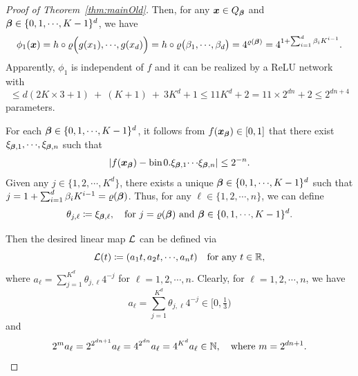 \documentclass[nohyperref]{article}
\theoremstyle{plain}
\theoremstyle{definition}
\theoremstyle{remark}
\begin{document}
\begin{proof}[Proof of Theorem~\ref{thm:mainOld}]
	Then, for any ${\bm{x}}\in Q_{\bm{\beta}}$ and $\bmbeta\in\{0,1,\cdots,K-1\}^d$, we have
	\begin{equation}
		\label{eq:psi1}
		\phi_1(\bmx)=h\circ\varrho\Big(g(x_1),\cdots,g(x_d)\Big)=h\circ\varrho\big(\beta_1,\cdots,\beta_d\big)=4^{\varrho(\bmbeta)}=4^{1+\sum_{i=1}^d \beta_i K^{i-1}}.
	\end{equation}
	Apparently, $\phi_1$ is independent of $f$ and it can be realized by a ReLU network with \[\le d(2K\times 3+1) \ +\  (K+1)\  +\   3K^d+1\le 11K^d +2=11\times 2^{dn}+2\le 2^{dn+4}\] parameters. 
	
	For each $\bmbeta\in \{0,1,\cdots,K-1\}^d$, it follows from $f({\bm{x}}_{\bm{\beta}})\in [0,1]$ that there exist 
	$\xi_{\bmbeta,1},\cdots,\xi_{\bmbeta,n}$ such that
	\begin{equation}
		\label{eq:fapproxbin}
		|f(\bmx_\bmbeta)-\bin 0.\xi_{\bmbeta,1}\cdots\xi_{\bmbeta,n}|\le 2^{-n}.
	\end{equation}
	Given any $j\in \{1,2,\cdots,K^d\}$, there exists a unique $\bmbeta\in \{0,1,\cdots,K-1\}^d$ such that $j=1+\sum_{i=1}^d \beta_i K^{i-1}=\varrho({\bm{\beta}})$. Thus, for any $\ell\in\{1,2,\cdots,n\}$, we can define
	\begin{equation}
		\label{eq:theta=xi}
		\theta_{j,\ell}\coloneqq\xi_{\bmbeta,\ell}, \quad \tn{for $j=\varrho(\bmbeta)$ and $\bmbeta\in \{0,1,\cdots,K-1\}^d$.}
	\end{equation}
	
	Then the desired linear map ${\mathcal{L}}$ can be defined via
	\begin{equation*}
		\calL(t)\coloneqq (a_1 t,a_2 t,\cdots, a_n t)\quad \tn{for any $t\in \R$,}
	\end{equation*}
	where $a_\ell=\sum_{j=1}^{K^d} \theta_{j,\ell}4^{-j}$ for $\ell=1,2,\cdots,n$. Clearly, for $\ell=1,2,\cdots,n$, we have
	\begin{equation*}
		a_\ell=\sum_{j=1}^{K^d} \theta_{j,\ell}4^{-j}\in [0,\tfrac{1}{3})
	\end{equation*}
	and 
	\begin{equation*}
		2^m a_\ell=2^{2^{dn+1}}a_\ell
		=4^{2^{dn}}a_\ell
		=4^{K^d}a_\ell\in \N, 
		\quad 
		\tn{where $m=2^{dn+1}$.}
	\end{equation*}
	

\end{proof}
\end{document}
